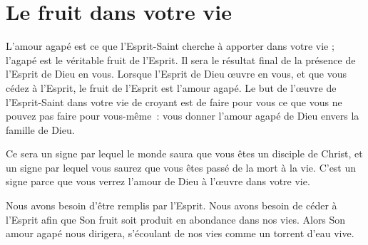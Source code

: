 \section*{Le fruit dans votre vie}

L'amour agapé est ce que l'Esprit-Saint cherche à apporter dans votre vie ;
 l'agapé est le véritable fruit de l'Esprit.
 Il sera le résultat final de la présence de l'Esprit de Dieu en vous.
 Lorsque l'Esprit de Dieu œuvre en vous, et que vous cédez à l'Esprit,
 le fruit de l'Esprit est l'amour agapé. Le but de l'œuvre de
 l'Esprit-Saint dans votre vie de croyant est de faire pour vous
 ce que vous ne pouvez pas faire pour vous-même~:
 vous donner l'amour agapé de Dieu envers la famille de Dieu.

Ce sera un signe par lequel le monde saura que vous êtes un disciple
 de Christ, et un signe par lequel vous saurez que vous êtes passé
 de la mort à la vie. C'est un signe parce que vous verrez
 l'amour de Dieu à l'œuvre dans votre vie.

Nous avons besoin d'être remplis par l'Esprit.
 Nous avons besoin de céder à l'Esprit afin que Son fruit soit produit
 en abondance dans nos vies. Alors Son amour agapé nous dirigera,
 s'écoulant de nos vies comme un torrent d'eau vive.
\closechapter

